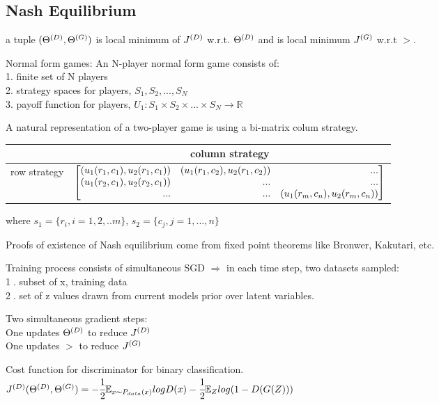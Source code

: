 \documentclass[12pt,a4paper]{article}
\begin{document}
\vspace{0.5cm}
\subsection{Nash Equilibrium}
a tuple $({\Theta^{(D)}}, {\Theta^{(G)}})$ is local minimum of $J^{(D)}$ w.r.t. ${\Theta^{(D)}}$ and is local minimum $J^{(G)}$ w.r.t $\gt$. 

Normal form games: An N-player normal form game consists of:\\
1. finite set of N players\\
2. strategy spaces for players, $S_1, S_2, ..., S_N$\\
3. payoff function for players, $U_1: S_1\times S_2\times...\times S_N\rightarrow \mathbb{R}$

A natural representation of a two-player game is using a bi-matrix colum strategy.

\begin{center}
\begin{tabular}{c | c}
    & column strategy \\
    \hline 
    row strategy & $\vecb{(u_1(r_1,c_1), u_2(r_1,c_1))&(u_1(r_1,c_2), u_2(r_1,c_2))&...\\
    (u_1(r_2,c_1), u_2(r_2,c_1)) & ... & ...\\
    ... & ... & (u_1(r_m,c_n), u_2(r_m,c_n))
    }$\\
\end{tabular}
\end{center}

where $s_1=\{r_i, i=1,2,..m\}$, $s_2=\{c_j, j=1,...,n\}$

Proofs of existence of Nash equilibrium come from fixed point theorems like Bronwer, Kakutari, etc. 

Training process consists of simultaneous SGD $\Rightarrow$ in each time step, two datasets sampled: \\
\textcircled{1}. subset of x, training data\\
\textcircled{2}. set of z values drawn from current models prior over latent variables.

Two simultaneous gradient steps:\\
One updates ${\Theta^{(D)}}$ to reduce $J^{(D)}$\\
One updates $\gt$ to reduce $J^{(G)}$

Cost function for discriminator for binary classification. \\
$J^{(D)}({\Theta^{(D)}},{\Theta^{(G)}})=-\cfrac{1}{2} \mathbb{E}_{x\sim P_{data}(x)}logD(x)-\cfrac{1}{2}\mathbb{E}_Zlog(1-D(G(Z)))$
\end{document}
